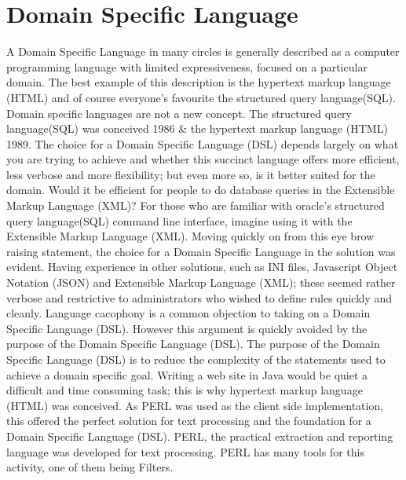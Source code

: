 \newpage

\section{Domain Specific Language} 
\label{sec:Domainspecificlanguage}

	A Domain Specific Language in many circles is generally described as a computer programming language with limited expressiveness,
	focused on a particular domain.  The best example of this description is the hypertext markup language (HTML) and
	of course everyone's favourite the structured query language(SQL).
	\newline
	\newline
	Domain specific languages are not a new concept.  
	The structured query language(SQL) was conceived 1986 \& the hypertext markup language (HTML) 1989.
	The choice for a Domain Specific Language (DSL) depends largely on what you are trying to achieve and whether this
	succinct language offers more efficient, less verbose and more flexibility; but even more so, is it better suited for the domain.
	Would it be efficient for people to do database queries in the Extensible Markup Language (XML)?   For those who are familiar with
	oracle's structured query language(SQL) command line interface, imagine using it with the Extensible Markup Language (XML).
	\newline
	\newline
	Moving quickly on from this eye brow raising statement, the choice for a Domain Specific Language in the solution was evident.
	Having experience in other solutions, such as INI files, Javascript Object Notation (JSON) and Extensible Markup Language (XML);
	these seemed rather verbose and restrictive to administrators who wished to define rules quickly and cleanly.
	Language cacophony is a common objection to taking on a Domain Specific Language (DSL).  However this argument is quickly avoided
	by the purpose of the Domain Specific Language (DSL).  The purpose of the Domain Specific Language (DSL) is to reduce the complexity of the statements
	used to achieve a domain specific goal.  Writing a web site in Java would be quiet a difficult and time consuming task; 
	this is why hypertext markup language (HTML) was conceived.
	\newline
	\newline
	As PERL was used as the client side implementation, this offered the perfect solution for text processing and the foundation for a Domain Specific Language (DSL).
	PERL, the practical extraction and reporting language was developed for text processing.  PERL has many tools for this activity, one of them being Filters.
